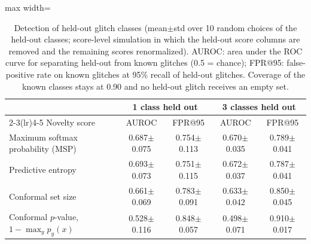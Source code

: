 \begin{table}[!htb]
\caption{Detection of held-out glitch classes (mean$\pm$std over 10 random choices of the held-out classes; score-level
simulation in which the held-out score columns are removed and the remaining scores renormalized). AUROC: area under the ROC
curve for separating held-out from known glitches (0.5 = chance); FPR@95: false-positive rate on known glitches at 95\% recall
of held-out glitches. Coverage of the known classes stays at 0.90 and no held-out glitch receives an empty set.}\label{tab:e3}
\centering\scriptsize\setlength{\tabcolsep}{4pt}
\begin{adjustbox}{max width=\columnwidth}\begin{tabular}{lcccc}\toprule
 & \multicolumn{2}{c}{1 class held out} & \multicolumn{2}{c}{3 classes held out}\\\cmidrule(lr){2-3}\cmidrule(lr){4-5}
Novelty score & AUROC & FPR@95 & AUROC & FPR@95\\\midrule
Maximum softmax probability (MSP) & 0.687$\pm$0.075 & 0.754$\pm$0.113 & 0.670$\pm$0.035 & 0.789$\pm$0.041\\
Predictive entropy & 0.693$\pm$0.073 & 0.751$\pm$0.115 & 0.672$\pm$0.037 & 0.787$\pm$0.041\\
Conformal set size & 0.661$\pm$0.069 & 0.783$\pm$0.091 & 0.633$\pm$0.042 & 0.850$\pm$0.045\\
Conformal $p$-value, $1-\max_y p_y(x)$ & 0.528$\pm$0.116 & 0.848$\pm$0.057 & 0.498$\pm$0.071 & 0.910$\pm$0.017\\
\bottomrule
\end{tabular}\end{adjustbox}
\end{table}
